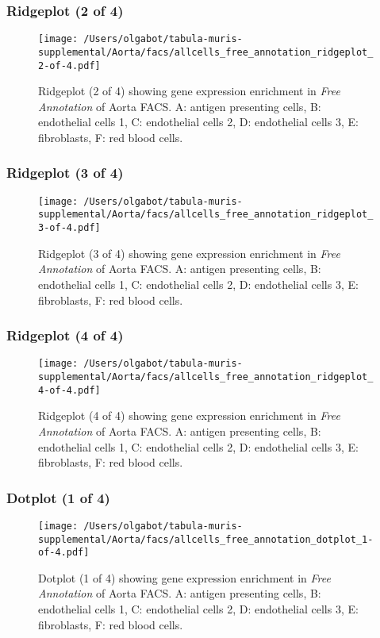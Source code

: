 \clearpage
\subsubsection{Ridgeplot (2 of 4)}
\begin{figure}[h]
\centering
\texttt{[image: /Users/olgabot/tabula-muris-supplemental/Aorta/facs/allcells\_free\_annotation\_ridgeplot\_2-of-4.pdf]}

\caption{ Ridgeplot (2 of 4)  showing gene expression enrichment in \emph{Free Annotation} of Aorta FACS. A: antigen presenting cells, B: endothelial cells 1, C: endothelial cells 2, D: endothelial cells 3, E: fibroblasts, F: red blood cells.}
\end{figure}


\clearpage
\subsubsection{Ridgeplot (3 of 4)}
\begin{figure}[h]
\centering
\texttt{[image: /Users/olgabot/tabula-muris-supplemental/Aorta/facs/allcells\_free\_annotation\_ridgeplot\_3-of-4.pdf]}

\caption{ Ridgeplot (3 of 4)  showing gene expression enrichment in \emph{Free Annotation} of Aorta FACS. A: antigen presenting cells, B: endothelial cells 1, C: endothelial cells 2, D: endothelial cells 3, E: fibroblasts, F: red blood cells.}
\end{figure}


\clearpage
\subsubsection{Ridgeplot (4 of 4)}
\begin{figure}[h]
\centering
\texttt{[image: /Users/olgabot/tabula-muris-supplemental/Aorta/facs/allcells\_free\_annotation\_ridgeplot\_4-of-4.pdf]}

\caption{ Ridgeplot (4 of 4)  showing gene expression enrichment in \emph{Free Annotation} of Aorta FACS. A: antigen presenting cells, B: endothelial cells 1, C: endothelial cells 2, D: endothelial cells 3, E: fibroblasts, F: red blood cells.}
\end{figure}


\clearpage
\subsubsection{Dotplot (1 of 4)}
\begin{figure}[h]
\centering
\texttt{[image: /Users/olgabot/tabula-muris-supplemental/Aorta/facs/allcells\_free\_annotation\_dotplot\_1-of-4.pdf]}

\caption{ Dotplot (1 of 4)  showing gene expression enrichment in \emph{Free Annotation} of Aorta FACS. A: antigen presenting cells, B: endothelial cells 1, C: endothelial cells 2, D: endothelial cells 3, E: fibroblasts, F: red blood cells.}
\end{figure}


